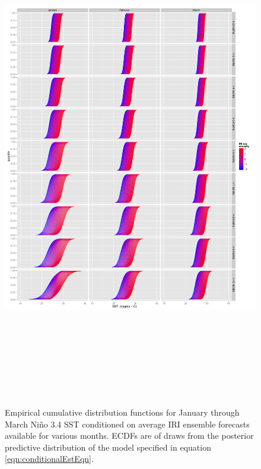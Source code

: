 \documentclass[authoryear]{article}
\begin{document}
\begin{figure}[!htbp]
\begin{center}
  \includegraphics[height=22cm, keepaspectratio]{Pricingfigs/conditionalCDFs01to03TraditionalCDFconfig}
  \caption{Empirical cumulative distribution functions for January through March Ni\~no 3.4 SST conditioned on average IRI ensemble forecasts available for various months. ECDFs are of draws from the posterior predictive distribution of the model specified in equation \ref{eqn:conditionalEstEqn}.}
   \label{fig:conditionalCDFs01to03}
   \end{center}
\end{figure}
\end{document}

